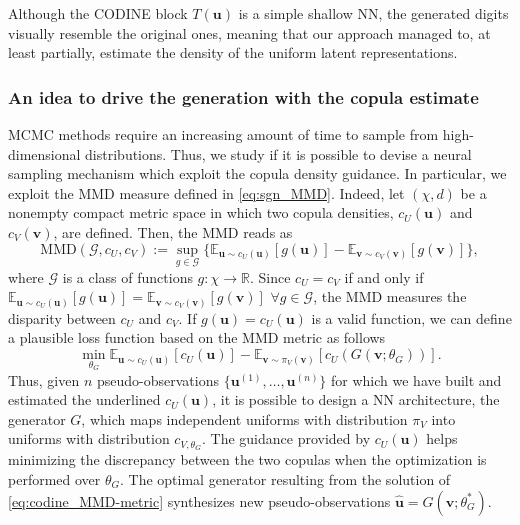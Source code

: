 Although the CODINE block $T(\mathbf{u})$ is a simple shallow NN, the generated digits visually resemble the original ones, meaning that our approach managed to, at least partially, estimate the density of the uniform latent representations.

\subsubsection{An idea to drive the generation with the copula estimate}
MCMC methods require an increasing amount of time to sample from high-dimensional distributions. Thus, we study if it is possible to devise a neural sampling mechanism which exploit the copula density guidance. In particular, we exploit the MMD measure defined in \eqref{eq:sgn_MMD}. Indeed, let $(\chi,d)$ be a nonempty compact metric space in which two copula densities, $c_U(\mathbf{u})$ and $c_V(\mathbf{v})$, are defined. Then, the MMD reads as
\begin{equation}
\text{MMD}(\mathcal{G},c_U,c_V) := \sup_{g\in \mathcal{G}}\bigl\{\mathbb{E}_{\mathbf{u}\sim c_U(\mathbf{u})}[g(\mathbf{u})]-\mathbb{E}_{\mathbf{v}\sim c_V(\mathbf{v})}[g(\mathbf{v})]\bigr\},
\label{eq:codine_MMD}
\end{equation}
where $\mathcal{G}$ is a class of functions $g:\chi \rightarrow \mathbb{R}$. 
Since $c_U=c_V$ if and only if $\mathbb{E}_{\mathbf{u}\sim c_U(\mathbf{u})}[g(\mathbf{u})]=\mathbb{E}_{\mathbf{v}\sim c_V(\mathbf{v})}[g(\mathbf{v})]$ $\forall g\in \mathcal{G}$, the MMD measures the disparity between $c_U$ and $c_V$. If $g(\mathbf{u})=c_U(\mathbf{u})$ is a valid function, we can define a plausible loss function based on the MMD metric as follows
\begin{equation}
\min_{\theta_G} \mathbb{E}_{\mathbf{u}\sim c_U(\mathbf{u})}[c_U(\mathbf{u})]-\mathbb{E}_{\mathbf{v}\sim \pi_V(\mathbf{v})}[c_U(G(\mathbf{v};\theta_G))].
\label{eq:codine_MMD-metric}
\end{equation}
Thus, given $n$ pseudo-observations $\{\mathbf{u}^{(1)},\dots,\mathbf{u}^{(n)}\}$ for which we have built and estimated the underlined $c_U(\mathbf{u})$, it is possible to design a NN architecture, the generator $G$, which maps independent uniforms with distribution $\pi_V$ into uniforms with distribution $c_{V,\theta_G}$. The guidance provided by $c_U(\mathbf{u})$ helps minimizing the discrepancy between the two copulas when the optimization is performed over $\theta_G$. The optimal generator resulting from the solution of \eqref{eq:codine_MMD-metric} synthesizes new pseudo-observations $\hat{\mathbf{u}} = G(\mathbf{v};\theta_G^*)$.

